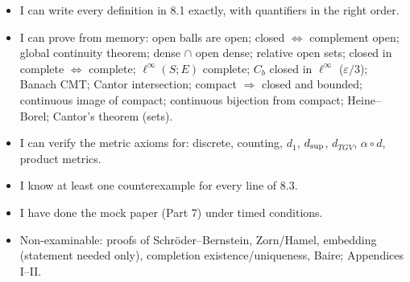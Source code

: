\begin{itemize}
\item[$\square$] I can write every definition in 8.1 exactly, with quantifiers in the right order.
\item[$\square$] I can prove from memory: open balls are open; closed $\iff$ complement open;
  global continuity theorem; dense $\cap$ open dense; relative open sets; closed in complete
  $\iff$ complete; $\ell^\infty(S;E)$ complete; $C_b$ closed in $\ell^\infty$ ($\varepsilon/3$);
  Banach CMT; Cantor intersection; compact $\Rightarrow$ closed and bounded; continuous image of
  compact; continuous bijection from compact; Heine--Borel; Cantor's theorem (sets).
\item[$\square$] I can verify the metric axioms for: discrete, counting, $d_1$, $d_{\sup}$,
  $d_{TGV}$, $\alpha\circ d$, product metrics.
\item[$\square$] I know at least one counterexample for every line of 8.3.
\item[$\square$] I have done the mock paper (Part 7) under timed conditions.
\item[$\square$] Non-examinable: proofs of Schr\"oder--Bernstein, Zorn/Hamel, embedding
  (statement needed only), completion existence/uniqueness, Baire; Appendices I--II.
\end{itemize}
